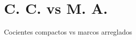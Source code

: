 \documentclass[compress,12pt]{beamer}
\begin{document}
\section{C. C. vs M. A.}
\begin{frame}{Cocientes compactos vs marcos arreglados}

\end{frame}
    
    

\end{document}
